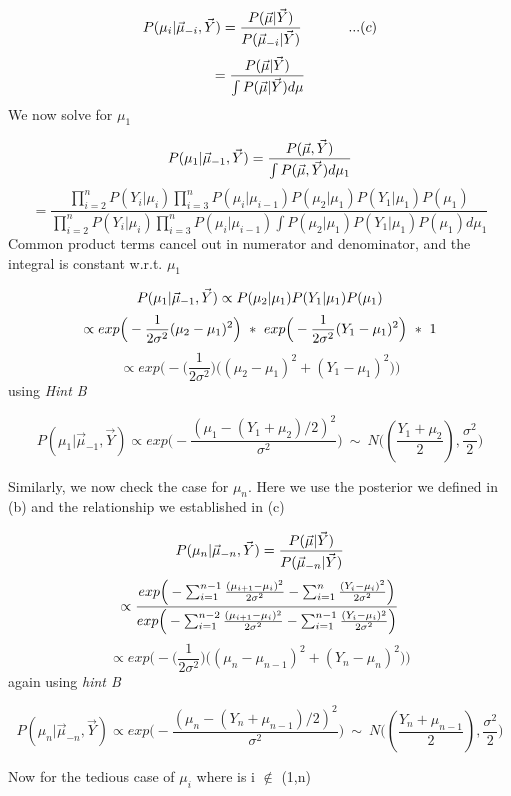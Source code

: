 \documentclass[
]{article}
\begin{document}
\[
P(\mu_i|\vec\mu_{-i}, \vec Y) = \frac{P(\vec{\mu} | \vec Y)}{P(\vec\mu_{-i}| \vec Y)} \ \ \ \ \ \ \ \ \ \ ...(c) \\
\] \[
 = \frac{P(\vec{\mu} | \vec Y)}{\int P(\vec\mu| \vec Y)d\mu}  \\
\] We now solve for \(\mu_1\)

\[
P(\mu_1|\vec\mu_{-1},\vec Y) = \frac{P(\vec\mu,\vec Y)}{\int P(\vec\mu,\vec Y)d\mu_1} \\
\] \[
= \frac{\prod_{i=2}^{n}P(Y_i|\mu_i)\prod_{i=3}^{n}P(\mu_i|\mu_{i-1})P(\mu_2|\mu_1)P(Y_1|\mu_1)P(\mu_1)}{\prod_{i=2}^{n}P(Y_i|\mu_i)\prod_{i=3}^{n}P(\mu_i|\mu_{i-1})\int P(\mu_2|\mu_1)P(Y_1|\mu_1)P(\mu_1)d\mu_1}
\] Common product terms cancel out in numerator and denominator, and the
integral is constant w.r.t. \(\mu_1\)

\[
P(\mu_1|\vec\mu_{-1},\vec Y) \propto P(\mu_2|\mu_1)P(Y_1|\mu_1)P(\mu_1) \\
\] \[
\propto exp\Big(-\frac{1}{2\sigma^2}(\mu_2 - \mu_1)^2 \Big) \ * \ exp \Big(-\frac{1}{2\sigma^2}(Y_1 - \mu_1)^2 \Big) \ * \ 1 \\
\] \[
\propto exp\Big(- \Big(\frac{1}{2\sigma^2} \Big) \Big((\mu_2 - \mu_1)^2 + (Y_1 - \mu_1)^2 \Big) \Big)
\] using \emph{Hint B}

\[
P(\mu_1|\vec\mu_{-1},\vec Y) \propto exp \Big( - \frac{(\mu_1 - (Y_1 + \mu_2)/2)^2}{\sigma^2} \Big) \ \sim \ N\Big((\frac{Y_1+\mu_2}{2}),\frac{\sigma^2}{2}\Big)
\]

Similarly, we now check the case for \(\mu_n\). Here we use the
posterior we defined in (b) and the relationship we established in (c)

\[
P(\mu_n|\vec\mu_{-n}, \vec Y) = \frac{P(\vec{\mu} | \vec Y)}{P(\vec\mu_{-n}| \vec Y)} \\
\] \[
\propto \frac{exp \Big(- \sum_{i=1}^{n-1} \frac{(\mu_{i+1} - \mu_i)^2}{2\sigma^2} - \sum_{i=1}^{n}\frac{(Y_{i} - \mu_i)^2}{2\sigma^2} \Big)}{exp \Big(- 
\sum_{i=1}^{n-2} \frac{(\mu_{i+1} - \mu_i)^2}{2\sigma^2} - \sum_{i=1}^{n-1}\frac{(Y_{i} - \mu_i)^2}{2\sigma^2} \Big)} \\
\] \[
\propto exp \Big(- \Big(\frac{1}{2\sigma^2} \Big) \Big((\mu_n - \mu_{n-1})^2 + (Y_n - \mu_n)^2 \Big) \Big)
\] again using \emph{hint B}

\[
P(\mu_n|\vec\mu_{-n},\vec Y) \propto exp \Big( - \frac{(\mu_n - (Y_n + \mu_{n-1})/2)^2}{\sigma^2} \Big) \ \sim \ N\Big((\frac{Y_n+\mu_{n-1}}{2}),\frac{\sigma^2}{2}\Big)
\]

Now for the tedious case of \(\mu_i\) where is i \(\not\in\) (1,n)
\end{document}
